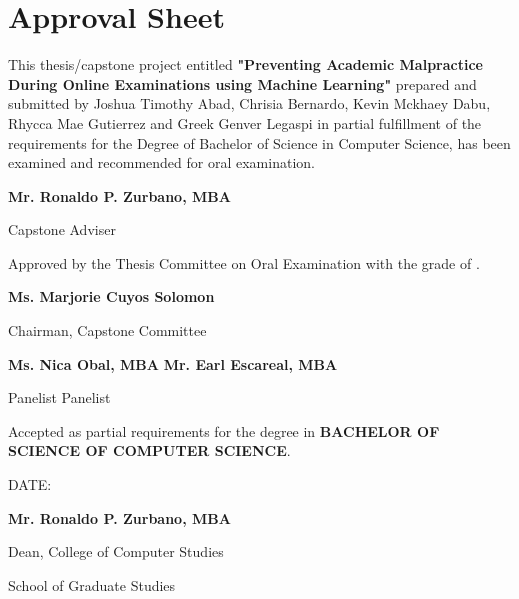 \section*{\hfill Approval Sheet \hfill}

This thesis/capstone project entitled \textbf{"Preventing Academic Malpractice During Online Examinations using Machine Learning" }prepared and submitted by Joshua Timothy Abad, Chrisia Bernardo, Kevin Mckhaey Dabu, Rhycca Mae Gutierrez and Greek Genver Legaspi in partial fulfillment of the requirements for the Degree of Bachelor of Science in Computer Science, has been examined and recommended for oral examination.

\vspace{2em}

\begin{flushright}
    \textbf{Mr. Ronaldo P. Zurbano, MBA}

    Capstone Adviser
\end{flushright}

\vspace{2em}

\noindent
Approved by the Thesis Committee on Oral Examination with the grade of \makebox[1.0in]{\hrulefill}.

\vspace{2em}

\begin{flushright}
    \textbf{Ms. Marjorie Cuyos Solomon }

    Chairman, Capstone Committee
\end{flushright}

\vspace{2em}

\noindent \textbf{Ms. Nica Obal, MBA} \hfill \textbf{Mr. Earl Escareal, MBA}

\noindent Panelist \hfill Panelist

\vspace{2em}

\noindent
Accepted as partial requirements for the degree in \textbf{BACHELOR OF SCIENCE OF COMPUTER SCIENCE}.

\noindent
DATE: \makebox[1.0in]{\hrulefill}

\vspace{2em}

\begin{flushright}
    \textbf{Mr. Ronaldo P. Zurbano, MBA}

    Dean, College of Computer Studies

    School of Graduate Studies
\end{flushright}
